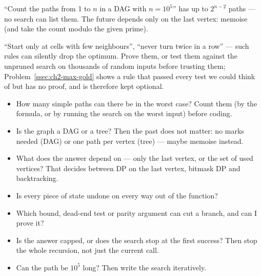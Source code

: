 \begin{warningbox}
``Count the paths from 1 to $n$ in a DAG with $n = 10^5$'' has up to $2^{n-2}$ paths --- no search can list them. The future depends only on the last vertex: memoise (and take the count modulo the given prime).
\end{warningbox}

\begin{warningbox}
``Start only at cells with few neighbours'', ``never turn twice in a row'' --- such rules can silently drop the optimum. Prove them, or test them against the unpruned search on thousands of random inputs before trusting them; Problem~\ref{ssec:ch2-max-gold} shows a rule that passed every test we could think of but has no proof, and is therefore kept optional.
\end{warningbox}

\begin{checklistbox}
\begin{itemize}[leftmargin=*]
    \item[$\square$] How many simple paths can there be in the worst case? Count them (by the formula, or by running the search on the worst input) before coding.
    \item[$\square$] Is the graph a DAG or a tree? Then the past does not matter: no marks needed (DAG) or one path per vertex (tree) --- maybe memoise instead.
    \item[$\square$] What does the answer depend on --- only the last vertex, or the set of used vertices? That decides between DP on the last vertex, bitmask DP and backtracking.
    \item[$\square$] Is every piece of state undone on every way out of the function?
    \item[$\square$] Which bound, dead-end test or parity argument can cut a branch, and can I prove it?
    \item[$\square$] Is the answer capped, or does the search stop at the first success? Then stop the whole recursion, not just the current call.
    \item[$\square$] Can the path be $10^5$ long? Then write the search iteratively.
\end{itemize}
\end{checklistbox}
